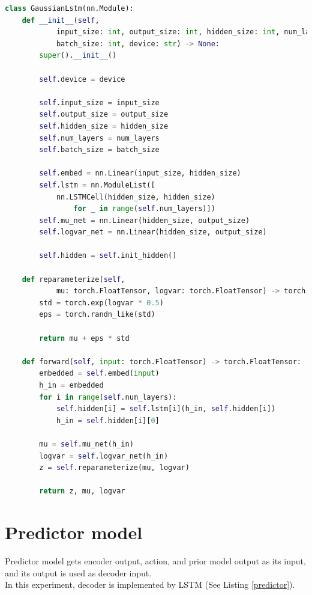\begin{lstlisting}[language=Python, caption={Python code of \textcolor{blue}{\textbf{GaussianLstm}} (some code is omitted).}, label={prior}]
class GaussianLstm(nn.Module):
    def __init__(self, 
            input_size: int, output_size: int, hidden_size: int, num_layers: int, 
            batch_size: int, device: str) -> None:
        super().__init__()
        
        self.device = device
        
        self.input_size = input_size
        self.output_size = output_size
        self.hidden_size = hidden_size
        self.num_layers = num_layers
        self.batch_size = batch_size
        
        self.embed = nn.Linear(input_size, hidden_size)
        self.lstm = nn.ModuleList([
            nn.LSTMCell(hidden_size, hidden_size) 
                for _ in range(self.num_layers)])
        self.mu_net = nn.Linear(hidden_size, output_size)
        self.logvar_net = nn.Linear(hidden_size, output_size)
        
        self.hidden = self.init_hidden()

    def reparameterize(self, 
            mu: torch.FloatTensor, logvar: torch.FloatTensor) -> torch.FloatTensor:
        std = torch.exp(logvar * 0.5)
        eps = torch.randn_like(std)
        
        return mu + eps * std
        
    def forward(self, input: torch.FloatTensor) -> torch.FloatTensor:
        embedded = self.embed(input)
        h_in = embedded
        for i in range(self.num_layers):
            self.hidden[i] = self.lstm[i](h_in, self.hidden[i])
            h_in = self.hidden[i][0]
            
        mu = self.mu_net(h_in)
        logvar = self.logvar_net(h_in)
        z = self.reparameterize(mu, logvar)
        
        return z, mu, logvar\end{lstlisting}

\section{Predictor model}
\indent
    Predictor model gets encoder output, action, and prior model output as its input, 
    and its output is used as decoder input. \\
    In this experiment, decoder is implemented by LSTM (See Listing \ref{predictor}).

